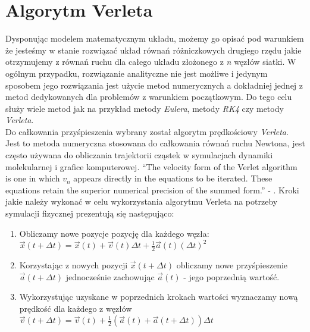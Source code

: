 \documentclass[12pt, letterpaper]{report}
\begin{document}
    \clearpage
    \section{Algorytm Verleta}
    Dysponując modelem matematycznym układu, możemy go opisać 
    pod warunkiem że jesteśmy w stanie rozwiązać układ równań różniczkowych 
    drugiego rzędu jakie otrzymujemy z równań ruchu dla całego układu złożonego z \emph{n} węzłów siatki.
    W ogólnym przypadku, rozwiązanie analityczne nie jest możliwe i jedynym sposobem jego rozwiązania 
    jest użycie metod numerycznych a dokładniej jednej z metod dedykowanych dla problemów z warunkiem początkowym.
    Do tego celu służy wiele metod jak na przykład metody \emph{Eulera}, metody \emph{RK4} czy metody \emph{Verleta}. \\


    Do całkowania przyśpieszenia wybrany został algorytm prędkościowy \emph{Verleta}. 
    Jest to metoda numeryczna stosowana do całkowania równań ruchu Newtona,
    jest często używana do obliczania trajektorii cząstek w symulacjach 
    dynamiki molekularnej i grafice komputerowej.
    ``The velocity form of the Verlet algorithm is one in
        which $v_{n}$ appears directly in the equations to be iterated.
        These equations retain the superior numerical precision
        of the summed form.'' - \cite{velocityverlet}.
    Kroki jakie należy wykonać w celu wykorzystania algorytmu Verleta na 
    potrzeby symulacji fizycznej prezentują się następująco:
    \begin{enumerate}
        \item Obliczamy nowe pozycje pozycję dla każdego węzła: 
        $\vec{x}(t + \Delta t) = \vec{x}(t) + \vec{v}(t) \Delta t + \frac{1}{2} \vec{a}(t) (\Delta t)^2$

        \item Korzystając z nowych pozycji $\vec{x}(t + \Delta t)$ obliczamy nowe 
        przyśpieszenie $\vec{a}(t + \Delta t)$ jednocześnie 
        zachowując $\vec{a}(t)$ - jego poprzednią wartość.

        \item Wykorzystując uzyskane w poprzednich krokach wartości wyznaczamy nową prędkość dla każdego z węzłów 
        $\vec{v}(t + \Delta t) = \vec{v}(t) + \frac{1}{2} \left( \vec{a}(t) + \vec{a}(t + \Delta t) \right) \Delta t$
    \end{enumerate}
\end{document}
